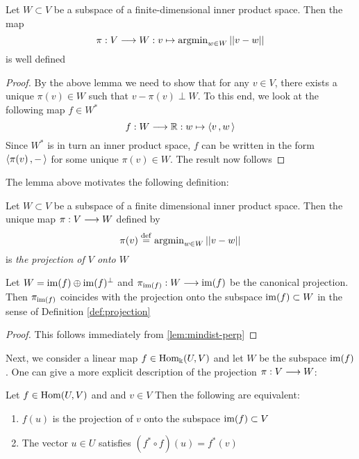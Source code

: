 \begin{lemma}\label{lem:projection}
	Let $W \subset V$ be a  subspace of a finite-dimensional inner product space. Then the map
	\[
	\pi: V\longrightarrow W: v \mapsto \operatorname{argmin}_{w \in W} \vert \vert v- w \vert \vert
	\]
	is well defined
\end{lemma}

\begin{proof}
	By the above lemma we need to show that for any $v \in V$, there exists a unique $\pi(v) \in W$ such that $v-\pi(v) \perp W$. To this end, we look at the following map $ f \in W^*$
	\[
	f: W \longrightarrow \mathbb{R}: w \mapsto \left\langle v\,,w\, \right\rangle
	\]
	Since $W^*$ is in turn an inner product space, $f$ can be written in the form $\left\langle \pi(v)\,,-\, \right\rangle$ for some unique $\pi(v) \in W$. The result now follows
\end{proof}

The lemma above motivates the following definition:

\begin{definition}\label{def:projection}
	Let $W\subset V$ be a subspace of a finite dimensional inner product space. Then the unique map $\pi: V\longrightarrow W$ defined by 
	\[
	\pi(v) \stackrel{\operatorname{def}}{=} \operatorname{argmin}_{w \in W}\vert \vert v-w \vert \vert
	\]
	is \emph{the projection of $V$ onto $W$}
\end{definition}
\begin{corollary}\label{lem:projcoincide}
	Let $W=\operatorname{im}(f)\oplus \operatorname{im}(f)^{\perp}$ and $\pi_{\operatorname{im}(f)}:W\longrightarrow \operatorname{im}(f)$ be the canonical projection. Then $\pi_{\operatorname{im}(f)}$ coincides with the projection onto the subspace $\operatorname{im}(f)\subset W$ in the sense of Definition \ref{def:projection}
\end{corollary}

\begin{proof}
This follows immediately from \ref{lem:mindist-perp}
\end{proof}
\noindent Next, we consider a linear map $f \in \operatorname{Hom}_\Bbbk(U,V)$ and let $W$ be the subspace $\operatorname{im}(f)$. One can give a more explicit description of the projection $\pi: V\longrightarrow W$:

\begin{lemma}\label{lem:normaleq}
	Let $f \in \operatorname{Hom}(U,V)$ and and $v \in V$ Then the following are equivalent:
	\begin{enumerate}
		\item	$f(u)$ is the projection of $v$ onto the subspace $\operatorname{im}(f)\subset V$
		\item The vector $u \in U$ satisfies $(f^* \circ f)(u) = f^*(v)$	
	\end{enumerate}
\end{lemma}

